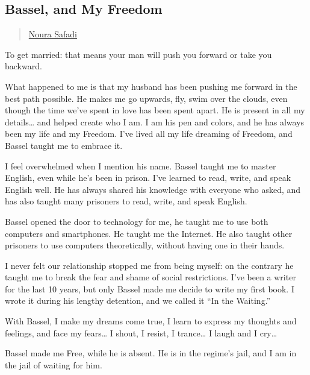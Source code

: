 \subsection{Bassel, and My Freedom}\label{bassel-and-my-freedom}

\begin{quote}
\hyperlink{noura-ghazi-safadi}{Noura Safadi}
\end{quote}

To get married: that means your man will push you forward or take you
backward.

What happened to me is that my husband has been pushing me forward in
the best path possible. He makes me go upwards, fly, swim over the
clouds, even though the time we've spent in love has been spent apart.
He is present in all my details\ldots{} and helped create who I am. I am
his pen and colors, and he has always been my life and my Freedom. I've
lived all my life dreaming of Freedom, and Bassel taught me to embrace
it.

I feel overwhelmed when I mention his name. Bassel taught me to master
English, even while he's been in prison. I've learned to read, write,
and speak English well. He has always shared his knowledge with everyone
who asked, and has also taught many prisoners to read, write, and speak
English.

Bassel opened the door to technology for me, he taught me to use both
computers and smartphones. He taught me the Internet. He also taught
other prisoners to use computers theoretically, without having one in
their hands.

I never felt our relationship stopped me from being myself: on the
contrary he taught me to break the fear and shame of social
restrictions. I've been a writer for the last 10 years, but only Bassel
made me decide to write my first book. I wrote it during his lengthy
detention, and we called it ``In the Waiting.''

With Bassel, I make my dreams come true, I learn to express my thoughts
and feelings, and face my fears\ldots{} I shout, I resist, I
trance\ldots{} I laugh and I cry\ldots{}

Bassel made me Free, while he is absent. He is in the regime's jail, and
I am in the jail of waiting for him.
